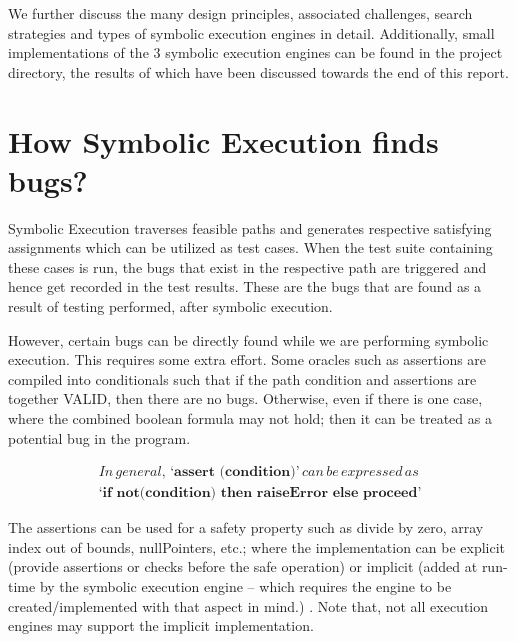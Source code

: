 \documentclass[11pt]{llncs}
\begin{document}
	\vspace{2mm}

We further discuss the many design principles, associated challenges, search strategies and types of symbolic execution engines in detail. Additionally, small implementations of the 3 symbolic execution engines can be found in the project directory, the results of which have been discussed towards the end of this report.




\section{How Symbolic Execution finds bugs?}
	
	Symbolic Execution traverses feasible paths and generates respective satisfying assignments which can be utilized as test cases. When the test suite containing these cases is run, the bugs that exist in the respective path are triggered and hence get recorded in the test results. \cite{7_UW_SE} These are the bugs that are found as a result of testing performed, after symbolic execution.

	However, certain bugs can be directly found while we are performing symbolic execution. This requires some extra effort. Some oracles such as assertions are compiled into conditionals such that if the path condition and assertions are together VALID, then there are no bugs. Otherwise, even if there is one case, where the combined boolean formula may not hold; then it can be treated as a potential bug in the program. \cite{7_UW_SE}
	
	\begin{equation}
		\begin{split}
			In \, general, \, \textbf{‘assert (condition)’}  \, can \, be \, expressed \, as \, \\
			 \textbf{‘if not(condition) then raiseError else proceed’} 
		\end{split}
	\end{equation}
	
	
	The assertions can be used for a safety property such as divide by zero, array index out of bounds, nullPointers, etc.; where the implementation can be explicit (provide assertions or checks before the safe operation) or implicit (added at run-time by the symbolic execution engine – which requires the engine to be created/implemented with that aspect in mind.) \cite{7_UW_SE}. Note that, not all execution engines may support the implicit implementation.
\end{document}
